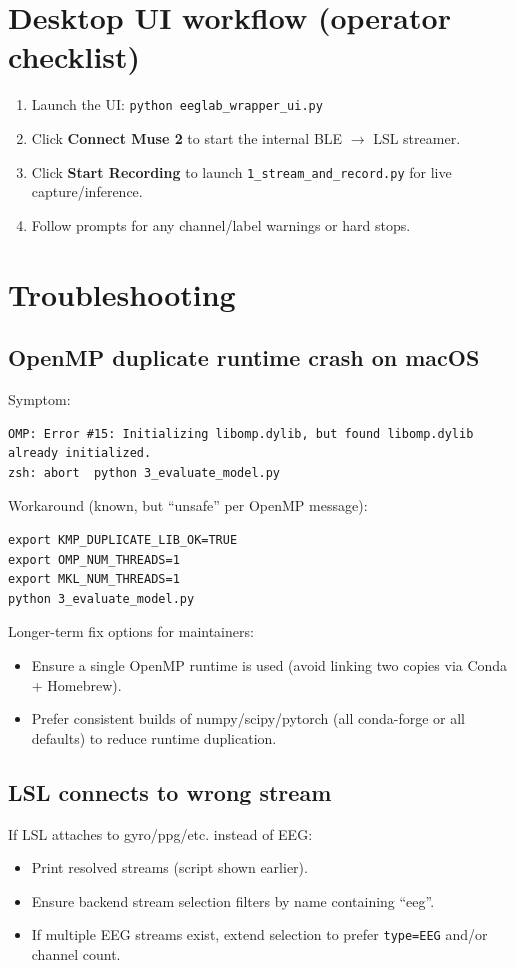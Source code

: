 \documentclass[11pt]{article}
\begin{document}
\section{Desktop UI workflow (operator checklist)}
\begin{enumerate}[leftmargin=*]
\item Launch the UI: \texttt{python eeglab\_wrapper\_ui.py}
\item Click \textbf{Connect Muse 2} to start the internal BLE $\rightarrow$ LSL streamer.
\item Click \textbf{Start Recording} to launch \texttt{1\_stream\_and\_record.py} for live capture/inference.
\item Follow prompts for any channel/label warnings or hard stops.
\end{enumerate}

\section{Troubleshooting}
\subsection{OpenMP duplicate runtime crash on macOS}
Symptom:
\begin{lstlisting}
OMP: Error #15: Initializing libomp.dylib, but found libomp.dylib already initialized.
zsh: abort  python 3_evaluate_model.py
\end{lstlisting}
Workaround (known, but ``unsafe'' per OpenMP message):
\begin{lstlisting}
export KMP_DUPLICATE_LIB_OK=TRUE
export OMP_NUM_THREADS=1
export MKL_NUM_THREADS=1
python 3_evaluate_model.py
\end{lstlisting}

Longer-term fix options for maintainers:
\begin{itemize}[leftmargin=*]
\item Ensure a single OpenMP runtime is used (avoid linking two copies via Conda + Homebrew).
\item Prefer consistent builds of numpy/scipy/pytorch (all conda-forge or all defaults) to reduce runtime duplication.
\end{itemize}

\subsection{LSL connects to wrong stream}
If LSL attaches to gyro/ppg/etc. instead of EEG:
\begin{itemize}[leftmargin=*]
\item Print resolved streams (script shown earlier).
\item Ensure backend stream selection filters by name containing ``eeg''.
\item If multiple EEG streams exist, extend selection to prefer \texttt{type=EEG} and/or channel count.
\end{itemize}
\end{document}
